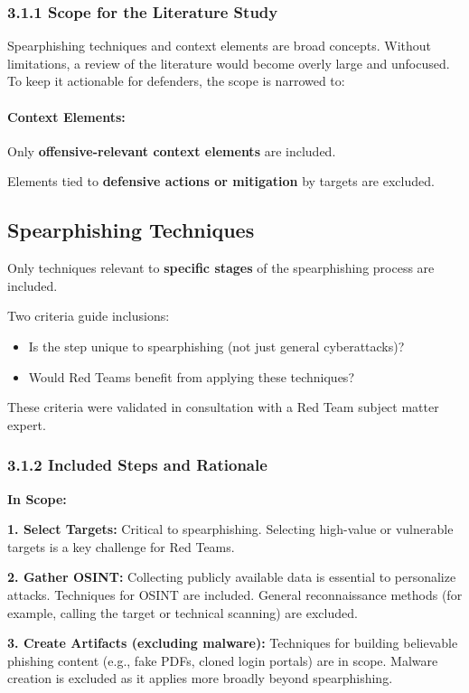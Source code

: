 \subsubsection{3.1.1 Scope for the Literature Study}

Spearphishing techniques and context elements are broad concepts. Without limitations, a review of the literature would become overly large and unfocused. To keep it actionable for defenders, the scope is narrowed to:

\paragraph{\textbf{Context Elements:}}
Only \textbf{offensive-relevant context elements} are included.

Elements tied to \textbf{defensive actions or mitigation} by targets are excluded.

\subsection{\textbf{Spearphishing Techniques}}
Only techniques relevant to \textbf{specific stages} of the spearphishing process are included.

Two criteria guide inclusions:
\begin{itemize}
    \item Is the step unique to spearphishing (not just general cyberattacks)?
    \item Would Red Teams benefit from applying these techniques?
\end{itemize}

These criteria were validated in consultation with a Red Team subject matter expert.

\subsubsection{3.1.2 Included Steps and Rationale}

\textbf{In Scope:}

\textbf{1. Select Targets:}
Critical to spearphishing. Selecting high-value or vulnerable targets is a key challenge for Red Teams.

\textbf{2. Gather OSINT:}
Collecting publicly available data is essential to personalize attacks. Techniques for OSINT are included. General reconnaissance methods (for example, calling the target or technical scanning) are excluded.

\textbf{3. Create Artifacts (excluding malware):}
Techniques for building believable phishing content (e.g., fake PDFs, cloned login portals) are in scope. Malware creation is excluded as it applies more broadly beyond spearphishing.

